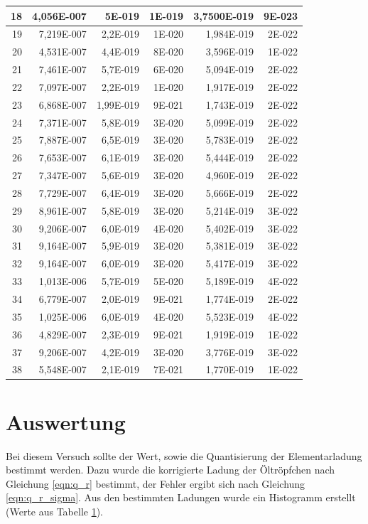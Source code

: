\documentclass[12pt]{scrartcl}
\begin{document}
\begin{table}[H]
\begin{center}
\begin{tabular}{|r|r|r|r|r|r|}
18 & 4,056E-007 & 5E-019 & 1E-019 & 3,7500E-019 & 9E-023 \\ \hline
19 & 7,219E-007 & 2,2E-019 & 1E-020 & 1,984E-019 & 2E-022 \\ \hline
20 & 4,531E-007 & 4,4E-019 & 8E-020 & 3,596E-019 & 1E-022 \\ \hline
21 & 7,461E-007 & 5,7E-019 & 6E-020 & 5,094E-019 & 2E-022 \\ \hline
22 & 7,097E-007 & 2,2E-019 & 1E-020 & 1,917E-019 & 2E-022 \\ \hline
23 & 6,868E-007 & 1,99E-019 & 9E-021 & 1,743E-019 & 2E-022 \\ \hline
24 & 7,371E-007 & 5,8E-019 & 3E-020 & 5,099E-019 & 2E-022 \\ \hline
25 & 7,887E-007 & 6,5E-019 & 3E-020 & 5,783E-019 & 2E-022 \\ \hline
26 & 7,653E-007 & 6,1E-019 & 3E-020 & 5,444E-019 & 2E-022 \\ \hline
27 & 7,347E-007 & 5,6E-019 & 3E-020 & 4,960E-019 & 2E-022 \\ \hline
28 & 7,729E-007 & 6,4E-019 & 3E-020 & 5,666E-019 & 2E-022 \\ \hline
29 & 8,961E-007 & 5,8E-019 & 3E-020 & 5,214E-019 & 3E-022 \\ \hline
30 & 9,206E-007 & 6,0E-019 & 4E-020 & 5,402E-019 & 3E-022 \\ \hline
31 & 9,164E-007 & 5,9E-019 & 3E-020 & 5,381E-019 & 3E-022 \\ \hline
32 & 9,164E-007 & 6,0E-019 & 3E-020 & 5,417E-019 & 3E-022 \\ \hline
33 & 1,013E-006 & 5,7E-019 & 5E-020 & 5,189E-019 & 4E-022 \\ \hline
34 & 6,779E-007 & 2,0E-019 & 9E-021 & 1,774E-019 & 2E-022 \\ \hline
35 & 1,025E-006 & 6,0E-019 & 4E-020 & 5,523E-019 & 4E-022 \\ \hline
36 & 4,829E-007 & 2,3E-019 & 9E-021 & 1,919E-019 & 1E-022 \\ \hline
37 & 9,206E-007 & 4,2E-019 & 3E-020 & 3,776E-019 & 3E-022 \\ \hline
38 & 5,548E-007 & 2,1E-019 & 7E-021 & 1,770E-019 & 1E-022 \\ \hline
\end{tabular}
\end{center}
\label{tab:messwerte_3}
\end{table}


\section{Auswertung}
Bei diesem Versuch sollte der Wert, sowie die Quantisierung der Elementarladung bestimmt werden. Dazu wurde die korrigierte Ladung der Öltröpfchen nach Gleichung \ref{eqn:q_r} bestimmt, der Fehler ergibt sich nach Gleichung \ref{eqn:q_r_sigma}. Aus den bestimmten Ladungen wurde ein Histogramm erstellt (Werte aus Tabelle \ref{tab:messwerte_3}).
\end{document}
